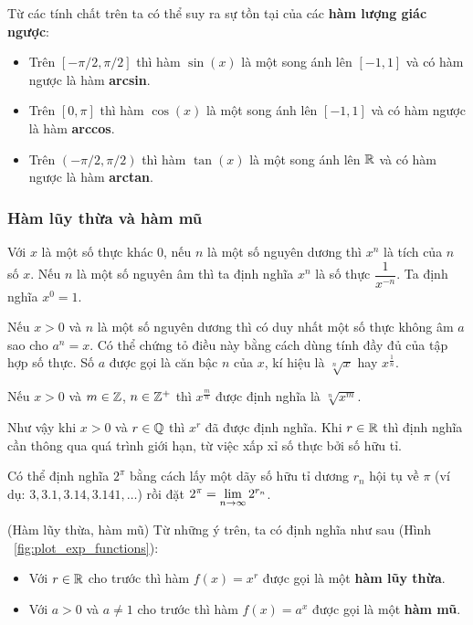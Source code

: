 \noindent Từ các tính chất trên ta có thể suy ra sự tồn tại của các \textbf{hàm lượng giác ngược}:
\begin{itemize}
    \item Trên $[-\pi/2, \pi/2]$ thì hàm $\sin(x)$ là một song ánh lên $[-1, 1]$ và có hàm ngược là hàm \textbf{arcsin}.
    \item Trên $[0, \pi]$ thì hàm $\cos(x)$ là một song ánh lên $[-1, 1]$ và có hàm ngược là hàm \textbf{arccos}.
    \item Trên $(-\pi/2, \pi/2)$ thì hàm $\tan(x)$ là một song ánh lên $\mathbb{R}$ và có hàm ngược là hàm \textbf{arctan}.
\end{itemize}

\subsubsection{Hàm lũy thừa và hàm mũ}

Với $x$ là một số thực khác 0, nếu $n$ là một số nguyên dương thì $x^n$ là tích của $n$ số $x$. Nếu $n$ là một số nguyên âm thì ta định nghĩa $x^n$ là số thực $\dfrac{1}{x^{-n}}$. Ta định nghĩa $x^0=1$.

Nếu $x > 0$ và $n$ là một số nguyên dương thì có duy nhất một số thực không âm $a$ sao cho $a^n = x$. Có thể chứng tỏ điều này bằng cách dùng tính đầy đủ của tập hợp số thực. Số $a$ được gọi là căn bậc $n$ của $x$, kí hiệu là $\sqrt[n]{x}$ hay $x^{\frac{1}{n}}$.

Nếu $x > 0$ và $m \in \mathbb{Z}$, $n \in \mathbb{Z}^+$ thì $x^{\frac{m}{n}}$ được định nghĩa là $\sqrt[n]{x^m}$.

Như vậy khi $x > 0$ và $r \in \mathbb{Q}$ thì $x^r$ đã được định nghĩa. Khi $r \in \mathbb{R}$ thì định nghĩa cần thông qua quá trình giới hạn, từ việc xấp xỉ số thực bởi số hữu tỉ.

\begin{example}
    Có thể định nghĩa $2^{\pi}$ bằng cách lấy một dãy số hữu tỉ dương $r_n$ hội tụ về $\pi$ (ví dụ: $3, 3.1, 3.14, 3.141, \dots$) rồi đặt $2^{\pi} = \lim\limits_{n \to \infty} 2^{r_n}$.
\end{example}

\begin{definition}(Hàm lũy thừa, hàm mũ) Từ những ý trên, ta có định nghĩa như sau (Hình ~\ref{fig:plot_exp_functions}):
    \begin{itemize}
        \item Với $r \in \mathbb{R}$ cho trước thì hàm $f(x) = x^r$ được gọi là một \textbf{hàm lũy thừa}.
        \item Với $a > 0$ và $a \ne 1$ cho trước thì hàm $f(x) = a^x$ được gọi là một \textbf{hàm mũ}.
    \end{itemize}
\end{definition}

